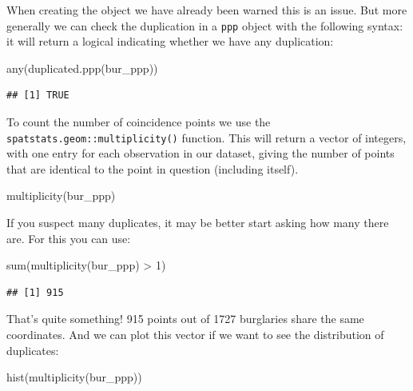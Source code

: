 \documentclass[
  krantz2]{krantz}
\makeatletter
\newenvironment{Shaded}{\begin{snugshade}}{\end{snugshade}}
\newcommand{\DecValTok}[1]{\textcolor[rgb]{0.06,0.06,0.06}{#1}}
\newcommand{\FunctionTok}[1]{\textcolor[rgb]{0,0,0}{#1}}
\newcommand{\NormalTok}[1]{#1}
\newcommand{\SpecialCharTok}[1]{\textcolor[rgb]{0,0,0}{#1}}
\newenvironment{kframe}{%
\medskip{}
\setlength{\fboxsep}{.8em}
 \def\at@end@of@kframe{}%
 \ifinner\ifhmode%
  \def\at@end@of@kframe{\end{minipage}}%
  \begin{minipage}{\columnwidth}%
 \fi\fi%
 \def\FrameCommand##1{\hskip\@totalleftmargin \hskip-\fboxsep
 \colorbox{shadecolor}{##1}\hskip-\fboxsep
     \hskip-\linewidth \hskip-\@totalleftmargin \hskip\columnwidth}%
 \MakeFramed {\advance\hsize-\width
   \@totalleftmargin\z@ \linewidth\hsize
   \@setminipage}}%
 {\par\unskip\endMakeFramed%
 \at@end@of@kframe}
\renewenvironment{Shaded}{\begin{kframe}}{\end{kframe}}
\makeatother
\begin{document}
When creating the object we have already been warned this is an issue. But more generally we can check the duplication in a \texttt{ppp} object with the following syntax: it will return a logical indicating whether we have any duplication:

\begin{Shaded}
\begin{Highlighting}[]
\FunctionTok{any}\NormalTok{(}\FunctionTok{duplicated.ppp}\NormalTok{(bur\_ppp))}
\end{Highlighting}
\end{Shaded}

\begin{verbatim}
## [1] TRUE
\end{verbatim}

To count the number of coincidence points we use the \texttt{spatstats.geom::multiplicity()} function. This will return a vector of integers, with one entry for each observation in our dataset, giving the number of points that are identical to the point in question (including itself).

\begin{Shaded}
\begin{Highlighting}[]
\FunctionTok{multiplicity}\NormalTok{(bur\_ppp)}
\end{Highlighting}
\end{Shaded}

If you suspect many duplicates, it may be better start asking how many there are. For this you can use:

\begin{Shaded}
\begin{Highlighting}[]
\FunctionTok{sum}\NormalTok{(}\FunctionTok{multiplicity}\NormalTok{(bur\_ppp) }\SpecialCharTok{\textgreater{}} \DecValTok{1}\NormalTok{)}
\end{Highlighting}
\end{Shaded}

\begin{verbatim}
## [1] 915
\end{verbatim}

That's quite something! 915 points out of 1727 burglaries share the same coordinates. And we can plot this vector if we want to see the distribution of duplicates:

\begin{Shaded}
\begin{Highlighting}[]
\FunctionTok{hist}\NormalTok{(}\FunctionTok{multiplicity}\NormalTok{(bur\_ppp))}
\end{Highlighting}
\end{Shaded}
\end{document}
